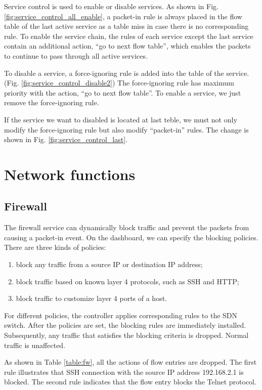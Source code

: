 Service control is used to enable or disable services.
As shown in Fig. \ref{fig:service_control_all_enable}, a packet-in rule is always placed in the flow table of the last active service as a table miss in case there is no corresponding rule.
To enable the service chain, the rules of each service except the last service contain an additional action, ``go to next flow table'', which enables the packets to continue to pass through all active services.

To disable a service, a force-ignoring rule is added into the table of the service. (Fig. \ref{fig:service_control_disable2})
The force-ignoring rule has maximum priority with the action, ``go to next flow table''.
To enable a service, we just remove the force-ignoring rule.

If the service we want to disabled is located at last teble, we must not only modify the force-ignoring rule but also modify ``packet-in'' rules.
The change is shown in Fig. \ref{fig:service_control_last}.


\section{Network functions} \label{sec:setwork_functions}
\subsection{Firewall}
The firewall service can dynamically block traffic and prevent the packets from causing a packet-in event.
On the dashboard, we can specify the blocking policies. There are three kinds of policies:
\begin{enumerate}[leftmargin=4em]
  \item block any traffic from a source IP or destination IP address;
  \item block traffic based on known layer 4 protocols, such as SSH and HTTP;
  \item block traffic to customize layer 4 ports of a host.
\end{enumerate}

For different policies, the controller applies corresponding rules to the SDN switch. After the policies are set, the blocking rules are immediately installed. Subsequently, any traffic that satisfies the blocking criteria is dropped. Normal traffic is unaffected.

As shown in Table \ref{table:fw}, all the actions of flow entries are dropped. The first rule illustrates that SSH connection with the source IP address 192.168.2.1 is blocked. The second rule indicates that the flow entry blocks the Telnet protocol.

